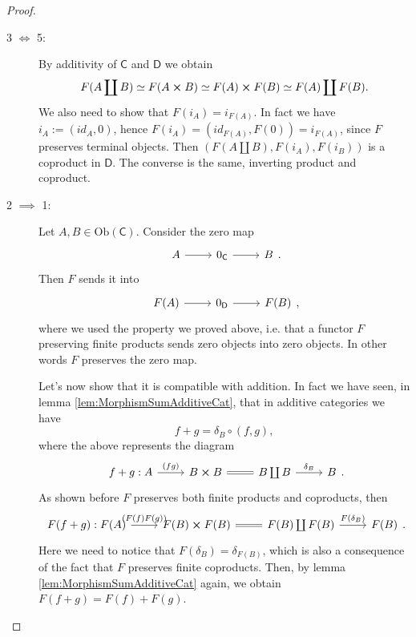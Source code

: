 \documentclass[../Main]{subfiles}
\begin{document}
\begin{proof}
\begin{description}
		\item[3 $\iff$ 5:] By additivity of $\mathsf{C}$ and $\mathsf{D}$ we obtain
				\begin{align}
					F(A \coprod B) \simeq F(A \cross B) \simeq
					F(A) \cross F(B) \simeq
					F(A) \coprod F(B)	
				.\end{align} 
				We also need to show that $F(i_A) = i_{F(A)}$.
				In fact we have $i_A := (id_A, 0)$,
				hence $F(i_A) = (id_{F(A)}, F(0)) = i_{F(A)}$, since
				$F$ preserves terminal objects.
				Then $\left(F(A \coprod B), F(i_A), F(i_B)\right)$
				is a coproduct in $\mathsf{D}$.
				The converse is the same, inverting product and coproduct.

		\item[2 $\implies$ 1:] Let $A, B \in \mathrm{Ob} \left(\mathsf{C}\right)$.
			Consider the zero map
			\begin{equation}
			\begin{tikzcd}
				A \arrow[r, "", rightarrow] &
				0_{\mathsf{C}} \arrow[r, "", rightarrow] &
				B
			\end{tikzcd}
			.\end{equation} 
			Then $F$ sends it into
			\begin{equation}
			\begin{tikzcd}
				F(A) \arrow[r, "", rightarrow] &
				0_{\mathsf{D}} \arrow[r, "", rightarrow] &
				F(B)
			\end{tikzcd}
			,\end{equation} 
			where we used the property we proved above, i.e. that
			a functor $F$ preserving finite products sends zero
			objects into zero objects.
			In other words $F$ preserves the zero map.

			Let's now show that it is compatible with addition.
			In fact we have seen, in lemma \ref{lem:MorphismSumAdditiveCat},
			that in additive categories we have
			\begin{equation}
				f + g = \delta_B \circ (f,g)
			,\end{equation} 
			where the above represents the diagram
			\begin{equation}
			\begin{tikzcd}
				f+g : A \arrow[r, "(f g)", rightarrow] &
				B \cross B \arrow[r, "", equals] &
				B \coprod B \arrow[r, "\delta_B", rightarrow] &
				B
			\end{tikzcd}
			.\end{equation} 
			As shown before $F$ preserves both finite products and coproducts, then
			\begin{equation}
			\begin{tikzcd}
				F(f+g): F(A) \arrow[r, "(F(f) F(g))", rightarrow] &
				F(B) \cross F(B) \arrow[r, "", equals] &
				F(B) \coprod F(B) \arrow[r, "F(\delta_B)", rightarrow] &
				F(B)
			\end{tikzcd}
			.\end{equation} 
			Here we need to notice that $F(\delta_B) = \delta_{F(B)}$, which
			is also a consequence of the fact that $F$ preserves finite coproducts.
			Then, by lemma \ref{lem:MorphismSumAdditiveCat} again,
			we obtain $F(f+g) = F(f) + F(g)$.


\end{description}
\end{proof}
\end{document}
